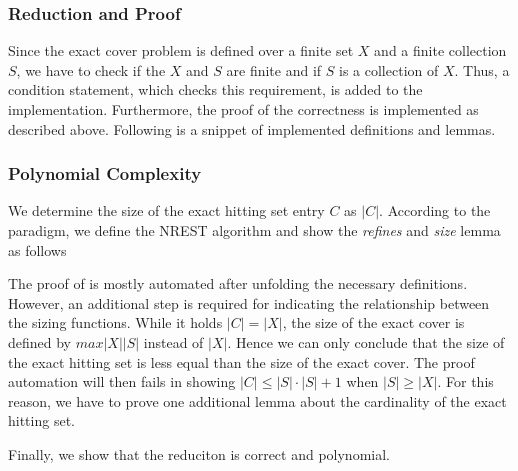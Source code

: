 \subsubsection{Reduction and Proof}
Since the exact cover problem is defined over a finite set $X$ and a finite collection $S$, we have to check if the $X$ and $S$ are finite and 
if $S$ is a collection of $X$. Thus, a condition statement, which checks this requirement, is added to the implementation. Furthermore,
the proof of the correctness is implemented as described above. Following is a snippet of implemented definitions and lemmas.

\subsubsection{Polynomial Complexity}
We determine the size of the exact hitting set entry $C$ as $|C|$. According to the paradigm, 
we define the NREST algorithm and show the \textit{refines} and \textit{size} lemma as follows


The proof of is mostly automated after unfolding the necessary definitions. 
However, an additional step is required for indicating the relationship between the sizing functions. 
While it holds $|C| = |X|$, 
the size of the exact cover is defined by $max |X| |S|$ instead of $|X|$. Hence we can
only conclude that the size of the exact hitting set is less equal than the size of the exact cover. 
The proof automation will then fails in showing $|C| \leq |S| \cdot |S| + 1$ when $|S| \geq |X|$. 
For this reason, we have to prove one additional lemma about the cardinality of the 
exact hitting set.


Finally, we show that the reduciton is correct and polynomial. 







